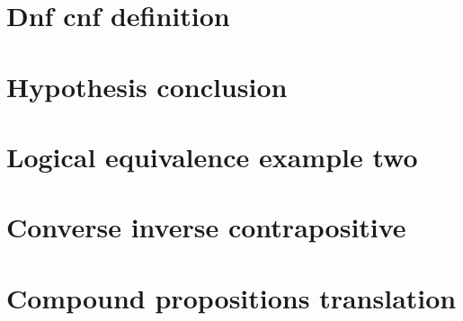 \section*{Dnf cnf definition}

\vfill
\section*{Hypothesis conclusion}

\vfill
\section*{Logical equivalence example two}

\vfill
\section*{Converse inverse contrapositive}

\vfill
\section*{Compound propositions translation}

\vfill
